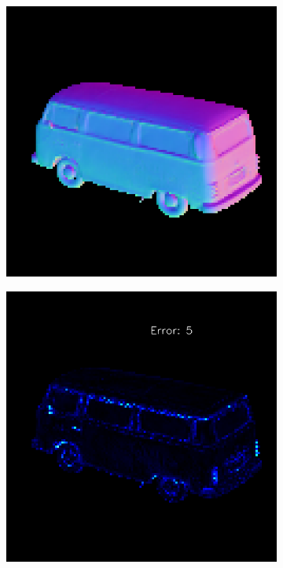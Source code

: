 \begin{figure}
\begin{subfigure}[b]{0.24\linewidth}
	\end{subfigure}
	\begin{subfigure}[b]{0.24\linewidth}
		\includegraphics[width=\linewidth]{./Figures/gcnn_synthetic/fancy_eval_9_normal_an2-8-1000.png}

	\end{subfigure}
	\begin{subfigure}[b]{0.24\linewidth}
		\includegraphics[width=\linewidth]{./Figures/gcnn_synthetic/fancy_eval_9_error_an2-8-1000.png}


\end{subfigure}
\end{figure}
